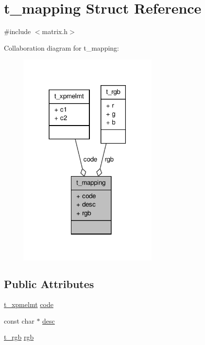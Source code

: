 \hypertarget{structt__mapping}{\section{t\-\_\-mapping \-Struct \-Reference}
\label{structt__mapping}
}


{\ttfamily \#include $<$matrix.\-h$>$}



\-Collaboration diagram for t\-\_\-mapping\-:
\nopagebreak
\begin{figure}[H]
\begin{center}
\leavevmode
\includegraphics[width=198pt]{structt__mapping__coll__graph}
\end{center}
\end{figure}
\subsection*{\-Public \-Attributes}
\begin{DoxyCompactItemize}
\item 
\hyperlink{structt__xpmelmt}{t\-\_\-xpmelmt} \hyperlink{structt__mapping_acd95c5cb6dd6d1eb653fad086b60a36c}{code}
\item 
const char $\ast$ \hyperlink{structt__mapping_a9efb95dce9813bfb078522cd93e06ea3}{desc}
\item 
\hyperlink{structt__rgb}{t\-\_\-rgb} \hyperlink{structt__mapping_a98417c94f109c3cbc1e9e0b25534216f}{rgb}
\end{DoxyCompactItemize}


